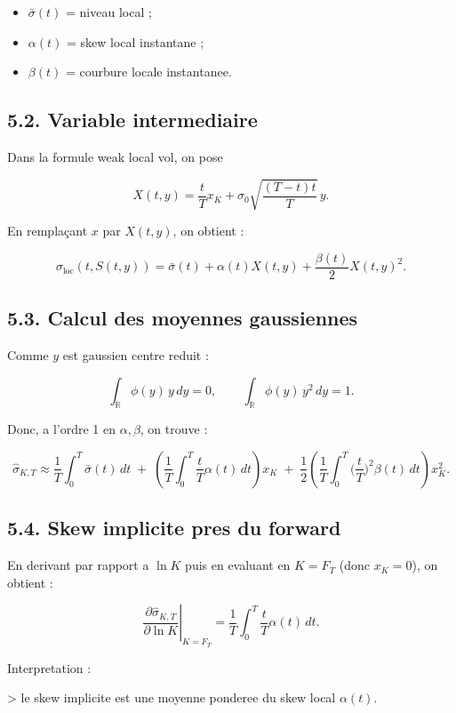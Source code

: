 \documentclass[11pt,a4paper]{article}
\begin{document}
\begin{itemize}
\item \(\bar{\sigma}(t)\) = niveau local ;
\item \(\alpha(t)\) = skew local instantane ;
\item \(\beta(t)\) = courbure locale instantanee.
\end{itemize}

\subsection{5.2. Variable intermediaire}

Dans la formule weak local vol, on pose

\[
X(t,y)=\frac{t}{T}x_K+\sigma_0\sqrt{\frac{(T-t)t}{T}}\,y.
\]

En remplaçant \(x\) par \(X(t,y)\), on obtient :

\[
\sigma_{\mathrm{loc}}(t,S(t,y))
=
\bar{\sigma}(t)+\alpha(t)X(t,y)+\frac{\beta(t)}{2}X(t,y)^2.
\]

\subsection{5.3. Calcul des moyennes gaussiennes}

Comme \(y\) est gaussien centre reduit :

\[
\int_{\mathbb R}\phi(y)\,y\,dy=0,
\qquad
\int_{\mathbb R}\phi(y)\,y^2\,dy=1.
\]

Donc, a l'ordre 1 en \(\alpha,\beta\), on trouve :

\[
\widehat{\sigma}_{K,T}
\approx
\frac{1}{T}\int_0^T \bar{\sigma}(t)\,dt
\;+\;
\left(
\frac{1}{T}\int_0^T \frac{t}{T}\alpha(t)\,dt
\right)x_K
\;+\;
\frac12
\left(
\frac{1}{T}\int_0^T\Big(\frac{t}{T}\Big)^2\beta(t)\,dt
\right)x_K^2.
\]

\subsection{5.4. Skew implicite pres du forward}

En derivant par rapport a \(\ln K\) puis en evaluant en \(K=F_T\) (donc \(x_K=0\)), on obtient :

\[
\boxed{
\left.\frac{\partial \widehat{\sigma}_{K,T}}{\partial\ln K}\right|_{K=F_T}
=
\frac{1}{T}\int_0^T \frac{t}{T}\alpha(t)\,dt.
}
\]

Interpretation :

> le skew implicite est une moyenne ponderee du skew local \(\alpha(t)\).
\end{document}
